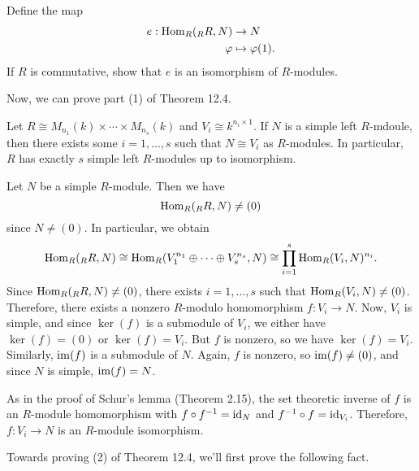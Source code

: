 \begin{exercise}
    Define the map 
    \begin{align*} 
        e : \operatorname{Hom}_R({}_R R, N) &\to N \\ \varphi &\mapsto \varphi(1). 
    \end{align*}
    If $R$ is commutative, show that $e$ is an isomorphism of $R$-modules. 
\end{exercise}

Now, we can prove part (1) of Theorem 12.4. 

\begin{thm}
    Let $R \cong M_{n_1}(k) \times \cdots \times M_{n_s}(k)$ and $V_i 
    \cong k^{n_i \times 1}$. If $N$ is a simple left $R$-mdoule, then there 
    exists some $i = 1, \dots, s$ such that $N \cong V_i$ as $R$-modules. 
    In particular, $R$ has exactly $s$ simple left $R$-modules up to 
    isomorphism. 
\end{thm}
\begin{pf}
    Let $N$ be a simple $R$-module. Then we have 
    \[ \operatorname{Hom}_R({}_R R, N) \neq (0) \] 
    since $N \neq (0)$. In particular, we obtain 
    \[ \operatorname{Hom}_R({}_R R, N) \cong \operatorname{Hom}_R(V_1^{n_1} \oplus \cdots \oplus V_s^{n_s}, 
    N) \cong \prod_{i=1}^s \operatorname{Hom}_R(V_i, N)^{n_i}. \] 
    Since $\operatorname{Hom}_R({}_R R, N) \neq (0)$, there exists $i = 1, \dots, s$ 
    such that $\operatorname{Hom}_R(V_i, N) \neq (0)$. Therefore, there exists a 
    nonzero $R$-modulo homomorphism $f : V_i \to N$. Now, $V_i$ is simple, 
    and since $\ker(f)$ is a submodule of $V_i$, we either have $\ker(f) 
    = (0)$ or $\ker(f) = V_i$. But $f$ is nonzero, so we have $\ker(f) = V_i$. 
    Similarly, $\operatorname{im}(f)$ is a submodule of $N$. Again, $f$ is nonzero, so 
    $\operatorname{im}(f) \neq (0)$, and since $N$ is simple, $\operatorname{im}(f) = N$. 

    As in the proof of Schur's lemma (Theorem 2.15), the set theoretic 
    inverse of $f$ is an $R$-module homomorphism with $f \circ f^{-1} 
    = \operatorname{id}_N$ and $f^{-1} \circ f = \operatorname{id}_{V_i}$. Therefore, $f : V_i \to N$ is 
    an $R$-module isomorphism. 
\end{pf}

Towards proving (2) of Theorem 12.4, we'll first prove the following fact. 


